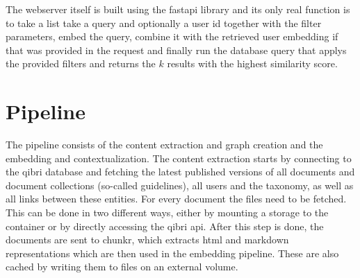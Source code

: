 \documentclass[draft,final]{vutinfth} %
\begin{document}
The webserver itself is built using the fastapi library and its only real function is to take a list take a query and optionally a user id together with the filter parameters, embed the query, combine it with the retrieved user embedding if that was provided in the request and finally run the database query that applys the provided filters and returns the $k$ results with the highest similarity score. 

\section{Pipeline}
The pipeline consists of the content extraction and graph creation and the embedding and contextualization. The content extraction starts by connecting to the qibri database and fetching the latest published versions of all documents and document collections (so-called guidelines), all users and the taxonomy, as well as all links between these entities. For every document the files need to be fetched. This can be done in two different ways, either by mounting a storage to the container or by directly accessing the qibri api. After this step is done, the documents are sent to chunkr, which extracts html and markdown representations which are then used in the embedding pipeline. These are also cached by writing them to files on an external volume. 
\end{document}
